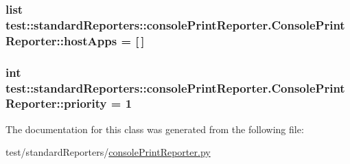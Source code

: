 \hypertarget{classtest_1_1standardReporters_1_1consolePrintReporter_1_1ConsolePrintReporter_a6f3b7f99b3c5d800962be7e653c98ba2}{
\subsubsection[{host\-Apps}]{\setlength{\rightskip}{0pt plus 5cm}list {\bf test\-::standard\-Reporters\-::console\-Print\-Reporter.\-Console\-Print\-Reporter\-::host\-Apps} = \mbox{[}$\,$\mbox{]}}}\label{d0/d7f/classtest_1_1standardReporters_1_1consolePrintReporter_1_1ConsolePrintReporter_a6f3b7f99b3c5d800962be7e653c98ba2}
\hypertarget{classtest_1_1standardReporters_1_1consolePrintReporter_1_1ConsolePrintReporter_a587d6e98e29b1e9aad8147c46547e574}{
\subsubsection[{priority}]{\setlength{\rightskip}{0pt plus 5cm}int {\bf test\-::standard\-Reporters\-::console\-Print\-Reporter.\-Console\-Print\-Reporter\-::priority} = 1}}\label{d0/d7f/classtest_1_1standardReporters_1_1consolePrintReporter_1_1ConsolePrintReporter_a587d6e98e29b1e9aad8147c46547e574}


\-The documentation for this class was generated from the following file\-:\begin{DoxyCompactItemize}
\item 
test/standard\-Reporters/\hyperlink{consolePrintReporter_8py}{console\-Print\-Reporter.\-py}\end{DoxyCompactItemize}

